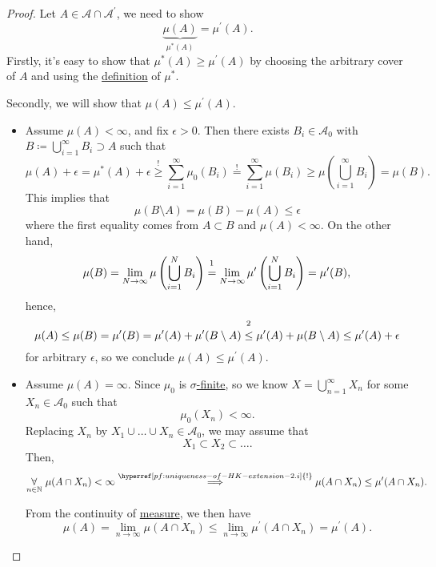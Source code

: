\begin{proof}
	Let \(A\in \mathcal{A} \cap \mathcal{A} ^\prime \), we need to show
	\[
		\underbrace{\mu (A)}_{\mu ^{*} (A)} = \mu ^\prime (A).
	\]
	Firstly, it's easy to show that \(\mu ^{*} (A)\geq \mu ^\prime (A)\) by choosing the arbitrary cover of \(A\) and using the \hyperref[prop:outer-measure]{definition}  of
	\(\mu ^{*} \).

	Secondly, we will show that \(\mu (A)\leq \mu ^\prime (A)\).
	\begin{itemize}
		\item \label{pf:uniqueness-of-HK-extension-2.i}Assume \(\mu (A)<\infty \), and fix \(\epsilon >0\). Then there exists \(B_{i}\in\mathcal{A} _0\) with \(B\coloneqq \bigcup\limits_{i=1}^{\infty} B_{i}\supset A\)
		      such that
		      \[
			      \mu (A)+\epsilon = \mu ^{*} (A) + \epsilon\overset{\hyperref[prop:outer-measure]{!}}{\geq} \sum\limits_{i=1}^{\infty} \mu _0(B_{i}) \overset{\hyperref[def:pre-measure-countable-additivity-within-the-algebra]{!}}{=} \sum\limits_{i=1}^{\infty} \mu (B_{i})\geq \mu \left(\bigcup\limits_{i=1}^{\infty} B_{i}\right) = \mu (B).
		      \]
		      This implies that
		      \[
			      \mu (B\setminus A) = \mu (B) - \mu (A)\leq \epsilon
		      \]
		      where the first equality comes from \(A\subset B\) and \(\mu (A)<\infty \). On the other hand,
		      \[
			      \mu (B) = \lim\limits_{N \to \infty} \mu \left(\bigcup\limits_{i=1}^{N} B_{i}\right) \overset{\footnotemark}{=} \lim\limits_{N \to \infty} \mu ^\prime \left(\bigcup\limits_{i=1}^{N} B_{i}\right) = \mu ^\prime (B),
		      \]
		      hence,
		      \[
			      \mu (A)\leq \mu (B) = \mu ^\prime (B) = \mu ^\prime (A)+\mu ^\prime (B\setminus A) \overset{\footnotemark}{\leq} \mu ^\prime (A) + \mu (B\setminus A) \leq \mu ^\prime (A) + \epsilon
		      \]
		      for arbitrary \(\epsilon \), so we conclude \(\mu (A)\leq \mu ^\prime (A)\).
		\item Assume \(\mu (A) = \infty \). Since \(\mu _0\) is \hyperref[def:finite-measure]{\(\sigma \)-finite}, so we know \(X = \bigcup\limits_{n=1}^{\infty} X_{n}\) for some \(X_{n}\in\mathcal{A} _0\) such that
		      \[
			      \mu _0(X_{n})<\infty.
		      \]
		      Replacing \(X_{n}\) by \(X_{1}\cup \ldots \cup X_{n} \in\mathcal{A} _0\), we may assume that
		      \[
			      X_1 \subset X_2 \subset \ldots.
		      \]
		      Then,
		      \[
			      \underset{n\in\mathbb{\MakeUppercase{N}} }{\forall}\ \mu (A \cap X_{n})<\infty\overset{\hyperref[pf:uniqueness-of-HK-extension-2.i]{!}}{\implies} \mu (A\cap X_{n})\leq \mu ^\prime (A\cap X_{n}).
		      \]

		      From the continuity of \hyperref[def:measure]{measure}, we then have
		      \[
			      \mu (A) = \lim\limits_{n \to \infty} \mu (A\cap X_{n})\leq \lim\limits_{n \to \infty} \mu ^\prime (A\cap X_{n}) = \mu ^\prime (A).
		      \]
	\end{itemize}
\end{proof}

